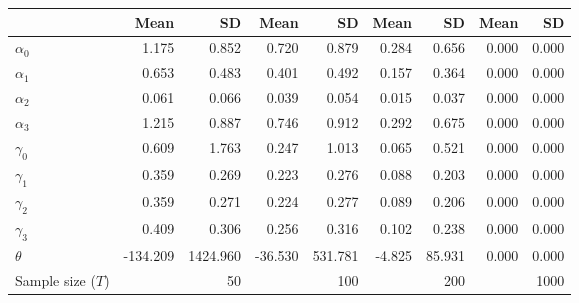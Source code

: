 
\begin{tabular}[t]{lrrrrrrrr}
\toprule
  & Mean & SD & Mean  & SD  & Mean   & SD   & Mean    & SD   \\
\midrule
$\alpha_{0}$ & 1.175 & 0.852 & 0.720 & 0.879 & 0.284 & 0.656 & 0.000 & 0.000\\
$\alpha_{1}$ & 0.653 & 0.483 & 0.401 & 0.492 & 0.157 & 0.364 & 0.000 & 0.000\\
$\alpha_{2}$ & 0.061 & 0.066 & 0.039 & 0.054 & 0.015 & 0.037 & 0.000 & 0.000\\
$\alpha_{3}$ & 1.215 & 0.887 & 0.746 & 0.912 & 0.292 & 0.675 & 0.000 & 0.000\\
$\gamma_{0}$ & 0.609 & 1.763 & 0.247 & 1.013 & 0.065 & 0.521 & 0.000 & 0.000\\
$\gamma_{1}$ & 0.359 & 0.269 & 0.223 & 0.276 & 0.088 & 0.203 & 0.000 & 0.000\\
$\gamma_{2}$ & 0.359 & 0.271 & 0.224 & 0.277 & 0.089 & 0.206 & 0.000 & 0.000\\
$\gamma_{3}$ & 0.409 & 0.306 & 0.256 & 0.316 & 0.102 & 0.238 & 0.000 & 0.000\\
$\theta$ & -134.209 & 1424.960 & -36.530 & 531.781 & -4.825 & 85.931 & 0.000 & 0.000\\
Sample size ($T$) &  & 50 &  & 100 &  & 200 &  & 1000\\
\bottomrule
\end{tabular}
